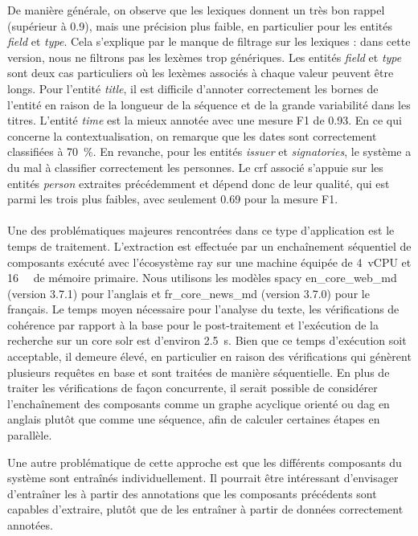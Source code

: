 De manière générale, on observe que les lexiques donnent un très bon rappel (supérieur à \num{0.9}), mais une précision plus faible, en particulier pour les entités \emph{field} et \emph{type}.
Cela s'explique par le manque de filtrage sur les lexiques : dans cette version, nous ne filtrons pas les lexèmes trop génériques.
Les entités \emph{field} et \emph{type} sont deux cas particuliers où les lexèmes associés à chaque valeur peuvent être longs.
Pour l'entité \emph{title}, il est difficile d'annoter correctement les bornes de l'entité en raison de la longueur de la séquence et de la grande variabilité dans les titres.
L'entité \emph{time} est la mieux annotée avec une mesure F1 de \num{0.93}.
En ce qui concerne la contextualisation, on remarque que les dates sont correctement classifiées à \SI{70}{\percent}.
En revanche, pour les entités \emph{issuer} et \emph{signatories}, le système a du mal à classifier correctement les personnes.
Le \gls{crf} associé s'appuie sur les entités \emph{person} extraites précédemment et dépend donc de leur qualité, qui est parmi les trois plus faibles, avec seulement \num{0.69} pour la mesure F1.

\paragraph{}
Une des problématiques majeures rencontrées dans ce type d'application est le temps de traitement.
L'extraction est effectuée par un enchaînement séquentiel de composants exécuté avec l'écosystème \gls{ray} sur une machine équipée de \SI{4}{vCPU} et \SI{16}{\giga\byte} de mémoire primaire.
Nous utilisons les modèles \gls{spacy} \textsf{en\_core\_web\_md} (version 3.7.1) pour l'anglais et \textsf{fr\_core\_news\_md} (version 3.7.0) pour le français.
Le temps moyen nécessaire pour l'analyse du texte, les vérifications de cohérence par rapport à la base pour le post-traitement et l'exécution de la recherche sur un core \gls{solr} est d'environ \SI{2.5}{\second}.
Bien que ce temps d'exécution soit acceptable, il demeure élevé, en particulier en raison des vérifications qui génèrent plusieurs requêtes en base et sont traitées de manière séquentielle.
En plus de traiter les vérifications de façon concurrente, il serait possible de considérer l'enchaînement des composants comme un graphe acyclique orienté ou \gls{dag} en anglais plutôt que comme une séquence, afin de calculer certaines étapes en parallèle.

Une autre problématique de cette approche est que les différents composants du système sont entraînés individuellement.
Il pourrait être intéressant d'envisager d'entraîner les  à partir des annotations que les composants précédents sont capables d'extraire, plutôt que de les entraîner à partir de données correctement annotées.

